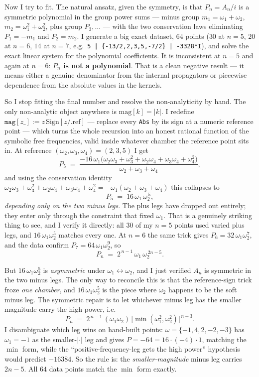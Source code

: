 \documentclass{article}
\begin{document}
Now I try to fit. The natural ansatz, given the symmetry, is that
$P_n=A_n/i$ is a symmetric polynomial in the group power sums --- minus group
$m_1=\omega_1+\omega_2$, $m_2=\omega_1^2+\omega_2^2$, plus group
$P_3,\dots$ --- with the two conservation laws eliminating $P_1=-m_1$ and
$P_2=m_2$. I generate a big exact dataset, $64$ points ($30$ at $n=5$, $20$ at
$n=6$, $14$ at $n=7$, e.g.\ \texttt{5 | \{-13/2,2,3,5,-7/2\} | -3328*I}), and
solve the exact linear system for the polynomial coefficients. It is inconsistent
at $n=5$ and again at $n=6$: \textbf{$P_n$ is not a polynomial}. That is a clean
negative result --- it means either a genuine denominator from the internal
propagators or piecewise dependence from the absolute values in the kernels.

So I stop fitting the final number and resolve the non-analyticity by hand. The
only non-analytic object anywhere is $\mathrm{mag}[k]=|k|$. I redefine
$\texttt{mag}[z\_]:=z\,\mathrm{Sign}[z/.\mathrm{ref}]$ --- replace every
\texttt{Abs} by its sign at a numeric reference point --- which turns the whole
recursion into an honest rational function of the symbolic free frequencies,
valid inside whatever chamber the reference point sits in. At reference
$(\omega_2,\omega_3,\omega_4)=(2,3,5)$ I get
\[
P_5 \;=\; \frac{-16\,\omega_1\big(\omega_2\omega_3+\omega_3^2+\omega_2\omega_4
+\omega_3\omega_4+\omega_4^2\big)}{\omega_2+\omega_3+\omega_4},
\]
and using the conservation identity
$\omega_2\omega_3+\omega_3^2+\omega_2\omega_4+\omega_3\omega_4+\omega_4^2
=-\omega_1(\omega_2+\omega_3+\omega_4)$ this collapses to
\[
P_5 \;=\; 16\,\omega_1\,\omega_2^{\,5},
\]
\emph{depending only on the two minus legs}. The plus legs have dropped out
entirely; they enter only through the constraint that fixed $\omega_1$. That is a
genuinely striking thing to see, and I verify it directly: all $30$ of my $n=5$
points used varied plus legs, and $16\,\omega_1\omega_2^5$ matches every one. At
$n=6$ the same trick gives $P_6=32\,\omega_1\omega_2^7$, and the data confirm
$P_7=64\,\omega_1\omega_2^9$, so
\[
P_n \;=\; 2^{\,n-1}\,\omega_1\,\omega_2^{\,2n-5}.
\]

But $16\,\omega_1\omega_2^5$ is \emph{asymmetric} under $\omega_1\leftrightarrow
\omega_2$, and I just verified $A_n$ is symmetric in the two minus legs. The only
way to reconcile this is that the reference-sign trick froze \emph{one chamber},
and $16\,\omega_1\omega_2^5$ is the piece where $\omega_2$ happens to be the soft
minus leg. The symmetric repair is to let whichever minus leg has the smaller
magnitude carry the high power, i.e.
\[
P_n \;=\; 2^{\,n-1}\,(\omega_1\omega_2)\,\big[\min(\omega_1^2,\omega_2^2)\big]^{\,n-3}.
\]
I disambiguate which leg wins on hand-built points: $\omega=\{-1,4,2,-2,-3\}$ has
$\omega_1=-1$ as the smaller-$|\cdot|$ leg and gives $P=-64=16\cdot(-4)\cdot1$,
matching the $\min$ form, while the ``positive-frequency-leg gets the high power''
hypothesis would predict $-16384$. So the rule is: the \emph{smaller-magnitude}
minus leg carries $2n-5$. All $64$ data points match the $\min$ form exactly.
\end{document}
